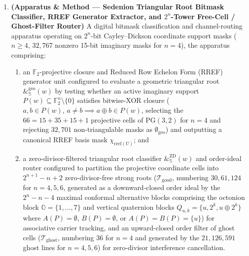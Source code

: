 \documentclass[12pt,letterpaper]{article}
\begin{document}
\begin{enumerate}[leftmargin=20pt,itemsep=4pt]
    \item \textbf{(Apparatus \& Method --- Sedenion Triangular Root Bitmask Classifier, RREF Generator Extractor, and $2^n$-Tower Free-Cell / Ghost-Filter Router)} A digital bitmask classification and channel-routing apparatus operating on $2^n$-bit Cayley--Dickson coordinate support masks ($n \ge 4$, $32{,}767$ nonzero 15-bit imaginary masks for $n = 4$), the apparatus comprising:
    \begin{enumerate}[leftmargin=16pt,itemsep=1pt]
        \item an $\mathbb{F}_2$-projective closure and Reduced Row Echelon Form (RREF) generator unit configured to evaluate a geometric triangular root $\&_{\mathbb{S}}^{\mathrm{geo}}(w)$ by testing whether an active imaginary support $P(w) \subseteq \mathbb{F}_2^n\setminus\{0\}$ satisfies bitwise-XOR closure ($a, b \in P(w),\, a \neq b \implies a \oplus b \in P(w)$, selecting the $66 = 15 + 35 + 15 + 1$ projective cells of $\mathrm{PG}(3,2)$ for $n = 4$ and rejecting $32{,}701$ non-triangulable masks as $\emptyset_{\mathrm{geo}}$) and outputting a canonical RREF basis mask $\chi_{\mathrm{rref}(U)}$; and
        \item a zero-divisor-filtered triangular root classifier $\&_{\mathbb{S}}^{\mathrm{ZD}}(w)$ and order-ideal router configured to partition the projective coordinate cells into $2^{n+1} - n + 2$ zero-divisor-free strong roots ($\mathcal{T}_{\mathrm{good}}$, numbering $30, 61, 124$ for $n = 4, 5, 6$, generated as a downward-closed order ideal by the $2^n - n - 4$ maximal conformal alternative blocks comprising the octonion block $\mathbb{O} = \{1,\dots,7\}$ and vertical quaternion blocks $Q_{u,k} = \{u, 2^k, u \oplus 2^k\}$ where $A(P)=\emptyset$, $B(P)=\emptyset$, or $A(P)=B(P)=\{u\}$) for associative carrier tracking, and an upward-closed order filter of ghost cells ($\mathcal{T}_{\mathrm{ghost}}$, numbering $36$ for $n = 4$ and generated by the $21, 126, 591$ ghost lines for $n = 4, 5, 6$) for zero-divisor interference cancellation.
    \end{enumerate}
\end{enumerate}

\newpage
\end{document}
